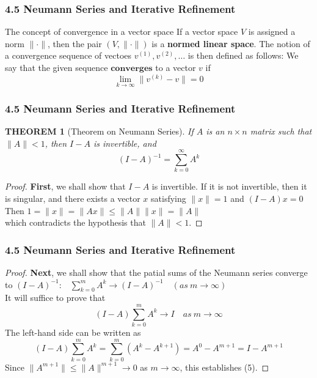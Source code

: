 \documentclass[notheorems,mathserif,table,compress]{beamer}  %
\begin{document}
\begin{frame}
  \frametitle{4.5 Neumann Series and Iterative Refinement}
  \begin{block}{The concept of convergence in a vector space}
  If a vector space $V$ is assigned a norm $\parallel \cdot\parallel$, then the pair $(V,\parallel \cdot \parallel)$ is a \textbf{normed linear space}. The notion of a convergence sequence of vectoes $v^{(1)},v^{(2)},\ldots$ is then defined as follows: We say that the given sequence $\textbf{converges}$ to a vector $v$ if 
  \[ \lim_{k \to \infty}\parallel v^{(k)}-v\parallel=0 \]
  \end{block}
\end{frame}


\begin{frame}
  \frametitle{4.5 Neumann Series and Iterative Refinement}
  \newtheorem{theorem}{THEOREM}
  \begin{theorem}[Theorem on Neumann Series]
  If $A$ is an $n\times n$ matrix such that $\parallel A\parallel<1$, then $I-A$ is invertible, and
  \begin{equation}
  (I-A)^{-1}=\sum_{k=0}^{\infty}A^k 
  \end{equation}
  \end{theorem}
  \begin{proof}
  \textbf{First}, we shall show that $I-A$ is invertible. If it is not invertible, then it is singular, and there exists a vector $x$ satisfying $\parallel x\parallel=1$ and $(I-A)x=0$\\
  Then $1=\parallel x\parallel=\parallel Ax \parallel \le \parallel A\parallel \parallel x\parallel=\parallel A \parallel$\\
  which contradicts the hypothesis that $\parallel A\parallel<1$.
  \end{proof}
\end{frame}


\begin{frame}
  \frametitle{4.5 Neumann Series and Iterative Refinement}
  \begin{proof}
  \textbf{Next}, we shall show that the patial sums of the Neumann series converge to $(I-A)^{-1}$:$\quad \sum_{k=0}^{m} A^k \to (I-A)^{-1} \quad(as \: m\to \infty)$\\
  It will suffice to prove that 
  \begin{equation}
  (I-A)\sum_{k=0}^{m} A^k\to I \quad as \: m \to \infty
  \end{equation}
  The left-hand side can be written as
  \[ (I-A)\sum_{k=0}^{m}A^k=\sum_{k=0}^{m}(A^k-A^{k+1})=A^0-A^{m+1}=I-A^{m+1} \]
  Since $\parallel A^{m+1}\parallel \le \parallel A\parallel^{m+1}\to0$ as $m\to \infty$, this establishes (5).
  \end{proof}
\end{frame}
\end{document}
